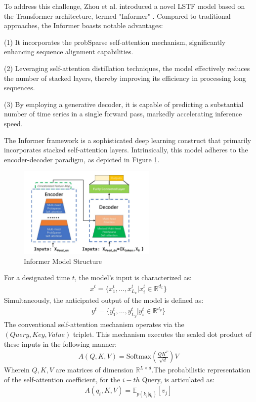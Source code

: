 \documentclass[sn-mathphys,Numbered]{sn-jnl}
\theoremstyle{thmstyleone}%
\theoremstyle{thmstyletwo}%
\theoremstyle{thmstylethree}%
\begin{document}
To address this challenge, Zhou et al. introduced a novel LSTF model based on the Transformer architecture, termed "Informer" \cite{zhou2021informer}. Compared to traditional approaches, the Informer boasts notable advantages:

\noindent (1) It incorporates the probSparse self-attention mechanism, significantly enhancing sequence alignment capabilities.

\noindent (2) Leveraging self-attention distillation techniques, the model effectively reduces the number of stacked layers, thereby improving its efficiency in processing long sequences.

\noindent (3) By employing a generative decoder, it is capable of predicting a substantial number of time series in a single forward pass, markedly accelerating inference speed.

The Informer framework is a sophisticated deep learning construct that primarily incorporates stacked self-attention layers. Intrinsically, this model adheres to the encoder-decoder paradigm, as depicted in Figure \ref{informer}.

\begin{figure}[h]
    \centering
    \includegraphics[width=0.6\textwidth]{pngs/informer.png}
    \caption{ Informer Model Structure}
    \label{informer}
\end{figure}
For a designated time \( t \), the model's input is characterized as:
\begin{align}
x^{t} = \lbrace x_{1}^{t}, \dots, x^{t}_{L_{x}} | x_{i}^{t} \in \mathbb{R}^{d_{x}} \rbrace
\end{align}
Simultaneously, the anticipated output of the model is defined as:
\begin{align}
y^{t} = \lbrace y_{1}^{t}, \dots, y^{t}_{L_{y}} | y_{i}^{t} \in \mathbb{R}^{d_{y}} \rbrace
\end{align}
The conventional self-attention mechanism operates via the \( (Query, Key, Value) \) triplet. This mechanism executes the scaled dot product of these inputs in the following manner:
\begin{align}
A(Q, K, V) = \text{Softmax}\left(\frac{QK^T}{\sqrt{d}}\right) V
\end{align}
Wherein \( Q, K, V \) are matrices of dimension \( \mathbb{R}^{L \times d} \).The probabilistic representation of the self-attention coefficient, for the \( i-th \) Query, is articulated as:
\begin{align}
A(q_i, K, V) = \mathbb{E}_{p(k_j | q_i)}\left[v_j\right]
\end{align}
\end{document}
